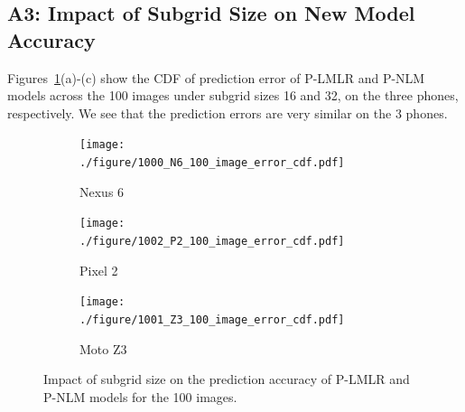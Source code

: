 \subsection*{A3: Impact of Subgrid Size on New Model Accuracy}

Figures~\ref{fig:100_images_expriment2}(a)-(c) show the CDF of
prediction error of P-LMLR and P-NLM models across the 100 images
under subgrid sizes 16 and 32, on the three phones, respectively.
We see that the prediction errors are very similar on the 3 phones.

\begin{figure}[tp]
	\begin{subfigure}[]{0.29\textwidth}
		\texttt{[image: ./figure/1000\_N6\_100\_image\_error\_cdf.pdf]}
        \vspace{-0.1in}
		\caption{Nexus 6}
	\end{subfigure}
	\begin{subfigure}[]{0.29\textwidth}
		\texttt{[image: ./figure/1002\_P2\_100\_image\_error\_cdf.pdf]}
        \vspace{-0.1in}
		\caption{Pixel 2}
	\end{subfigure}
	\begin{subfigure}[]{0.29\textwidth}
		\texttt{[image: ./figure/1001\_Z3\_100\_image\_error\_cdf.pdf]}
        \vspace{-0.1in}
		\caption{Moto Z3}
	\end{subfigure}
        \vspace{-0.1in}
	\caption{Impact of subgrid size on the prediction accuracy of P-LMLR and P-NLM models
          for the 100 images.}
	\label{fig:100_images_expriment2}
\end{figure}

